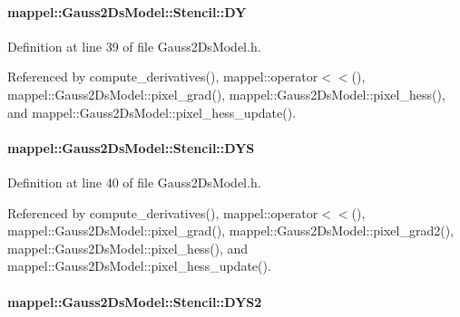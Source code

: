 \paragraph[{\texorpdfstring{DY}{DY}}]{ mappel\+::\+Gauss2\+Ds\+Model\+::\+Stencil\+::\+DY}\hypertarget{classmappel_1_1Gauss2DsModel_1_1Stencil_a7d3d2110d68cb783dee950dac2dad170}{}\label{classmappel_1_1Gauss2DsModel_1_1Stencil_a7d3d2110d68cb783dee950dac2dad170}


Definition at line 39 of file Gauss2\+Ds\+Model.\+h.



Referenced by compute\+\_\+derivatives(), mappel\+::operator$<$$<$(), mappel\+::\+Gauss2\+Ds\+Model\+::pixel\+\_\+grad(), mappel\+::\+Gauss2\+Ds\+Model\+::pixel\+\_\+hess(), and mappel\+::\+Gauss2\+Ds\+Model\+::pixel\+\_\+hess\+\_\+update().

\paragraph[{\texorpdfstring{D\+YS}{DYS}}]{ mappel\+::\+Gauss2\+Ds\+Model\+::\+Stencil\+::\+D\+YS}\hypertarget{classmappel_1_1Gauss2DsModel_1_1Stencil_af4b7f42541c0ae6501560602b0b2148b}{}\label{classmappel_1_1Gauss2DsModel_1_1Stencil_af4b7f42541c0ae6501560602b0b2148b}


Definition at line 40 of file Gauss2\+Ds\+Model.\+h.



Referenced by compute\+\_\+derivatives(), mappel\+::operator$<$$<$(), mappel\+::\+Gauss2\+Ds\+Model\+::pixel\+\_\+grad(), mappel\+::\+Gauss2\+Ds\+Model\+::pixel\+\_\+grad2(), mappel\+::\+Gauss2\+Ds\+Model\+::pixel\+\_\+hess(), and mappel\+::\+Gauss2\+Ds\+Model\+::pixel\+\_\+hess\+\_\+update().

\paragraph[{\texorpdfstring{D\+Y\+S2}{DYS2}}]{ mappel\+::\+Gauss2\+Ds\+Model\+::\+Stencil\+::\+D\+Y\+S2}\hypertarget{classmappel_1_1Gauss2DsModel_1_1Stencil_af88ab1c26e71a1de6d9c0d94187ff3b5}{}\label{classmappel_1_1Gauss2DsModel_1_1Stencil_af88ab1c26e71a1de6d9c0d94187ff3b5}


